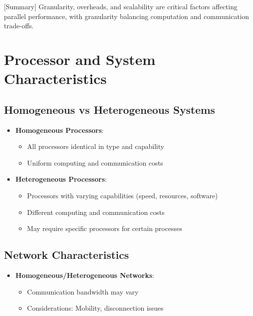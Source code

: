 \documentclass[12pt]{article}
\begin{document}
[Summary] Granularity, overheads, and scalability are critical factors affecting parallel performance, with granularity balancing computation and communication trade-offs.

\section{Processor and System Characteristics}

\subsection{Homogeneous vs Heterogeneous Systems}
\begin{itemize}
\item \textbf{Homogeneous Processors}:
  \begin{itemize}
  \item All processors identical in type and capability
  \item Uniform computing and communication costs
  \end{itemize}
  
\item \textbf{Heterogeneous Processors}:
  \begin{itemize}
  \item Processors with varying capabilities (speed, resources, software)
  \item Different computing and communication costs
  \item May require specific processors for certain processes
  \end{itemize}
\end{itemize}

\subsection{Network Characteristics}
\begin{itemize}
\item \textbf{Homogeneous/Heterogeneous Networks}:
  \begin{itemize}
  \item Communication bandwidth may vary
  \item Considerations: Mobility, disconnection issues
  \end{itemize}
\end{itemize}
\end{document}
